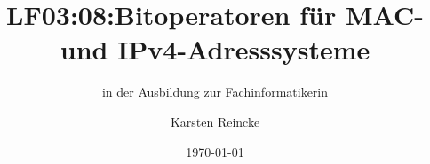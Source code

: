 \documentclass[]{beamer}
\title{LF03:08:Bitoperatoren für MAC- und IPv4-Adresssysteme}
\subtitle{in der Ausbildung zur Fachinformatikerin}
\institute[GS-LDK]{Gewerbliche Schulen Dillenburg}
\author{Karsten Reincke}
\date{\today}
\def\cfgGl{../../../cfg.gl/}
\begin{document}

\begin{frame}
  \titlepage

  
\end{frame}






\logo{}
\newpage



%
\end{document}
